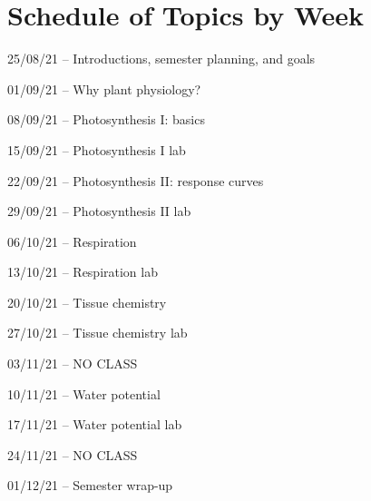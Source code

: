 \documentclass[12pt, notitlepage]{article}   	%
\begin{document}
{\section*{Schedule of Topics by Week}
25/08/21 – Introductions, semester planning, and goals \par
01/09/21 – Why plant physiology? \par
08/09/21 – Photosynthesis I: basics \par
15/09/21 – Photosynthesis I lab \par
22/09/21 – Photosynthesis II: response curves \par
29/09/21 – Photosynthesis II lab \par
06/10/21 – Respiration \par
13/10/21 – Respiration lab \par
20/10/21 – Tissue chemistry \par
27/10/21 – Tissue chemistry lab \par
03/11/21 – NO CLASS \par
10/11/21 – Water potential \par
17/11/21 – Water potential lab \par
24/11/21 – NO CLASS \par
01/12/21 – Semester wrap-up \par

} %
\end{document}
